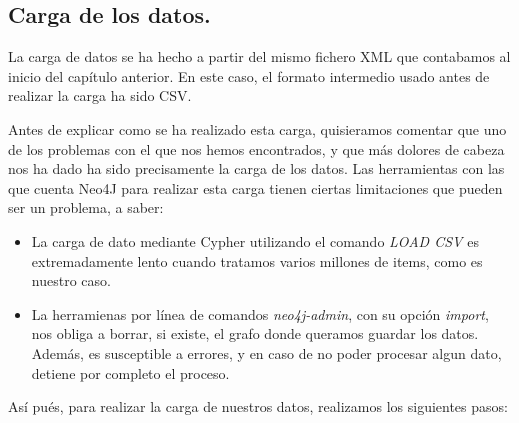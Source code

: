 \subsection{Carga de los datos.}

La carga de datos se ha hecho a partir del mismo fichero \gls{XML} que contabamos al inicio del capítulo anterior. En este caso, el formato intermedio usado antes de realizar la carga ha sido \gls{CSV}. 

Antes de explicar como se ha realizado esta carga, quisieramos comentar que uno de los problemas con el que nos hemos encontrados, y que más dolores de cabeza nos ha dado ha sido precisamente la carga de los datos. Las herramientas con las que cuenta Neo4J para realizar esta carga tienen ciertas limitaciones que pueden ser un problema, a saber:

\begin{itemize}
 \item La carga de dato mediante Cypher utilizando el comando \textit{LOAD CSV} es extremadamente lento cuando tratamos varios millones de items, como es nuestro caso.
 \item La herramienas por línea de comandos \textit{neo4j-admin}, con su opción \textit{import}, nos obliga a borrar, si existe, el grafo donde queramos guardar los datos. Además, es susceptible a errores, y en caso de no poder procesar algun dato, detiene por completo el proceso.
\end{itemize}

Así pués, para realizar la carga de nuestros datos, realizamos los siguientes pasos:

